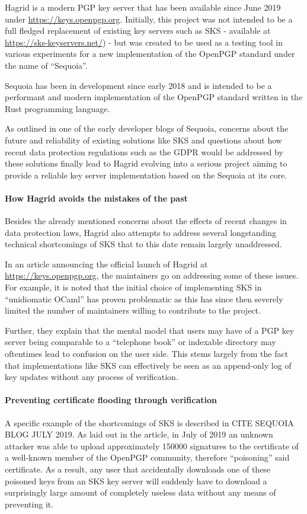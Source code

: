 

Hagrid is a modern PGP key server that has been available since June 2019 under \url{https://keys.openpgp.org}. 
Initially, this project was not intended to be a full fledged replacement of existing key servers such as SKS - available at \url{https://sks-keyservers.net/}) - but was created to be used as a testing tool in various experiments for a new implementation of the OpenPGP standard under the name of ``Sequoia''.

Sequoia has been in development since early 2018 and is intended to be a performant and modern implementation of the OpenPGP standard written in the Rust programming language.

As outlined in one of the early developer blogs of Sequoia, concerns about the future and reliability of existing solutions like SKS and questions about how recent data protection regulations such as the GDPR would be addressed by these solutions finally lead to Hagrid evolving into a serious project aiming to provide a reliable key server implementation based on the Sequoia at its core.


\paragraph{How Hagrid avoids the mistakes of the past}
\label{sec:hagrid_solves}
Besides the already mentioned concerns about the effects of recent changes in data protection laws, Hagrid also attempts to address several longstanding technical shortcomings of SKS that to this date remain largely unaddressed.

In an article announcing the official launch of Hagrid at \url{https://keys.openpgp.org}, the maintainers go on addressing some of these issues. For example, it is noted that the initial choice of implementing SKS in ``unidiomatic OCaml'' has proven problematic as this has since then severely limited the number of maintainers willing to contribute to the project.


Further, they explain that the mental model that users may have of a PGP key server being comparable to a ``telephone book'' or indexable directory may oftentimes lead to confusion on the user side. This stems largely from the fact that implementations like SKS can effectively be seen as an append-only log of key updates without any process of verification.  

\paragraph{Preventing certificate flooding through verification}
A specific example of the shortcomings of SKS is described in CITE SEQUOIA BLOG JULY 2019. 
As laid out in the article, in July of 2019 an unknown attacker was able to upload approximately 150000 signatures to the certificate of a well-known member of the OpenPGP community, therefore ``poisoning'' said certificate. As a result, any user that accidentally downloads one of these poisoned keys from an SKS key server will suddenly have to download a surprisingly large amount of completely useless data without any means of preventing it.

